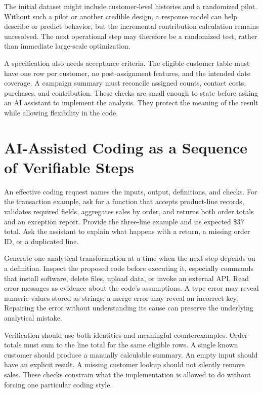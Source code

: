 The initial dataset might include customer-level histories and a
randomized pilot. Without such a pilot or another credible design, a
response model can help describe or predict behavior, but the
incremental contribution calculation remains unresolved. The next
operational step may therefore be a randomized test, rather than
immediate large-scale optimization.

A specification also needs acceptance criteria. The eligible-customer
table must have one row per customer, no post-assignment features, and
the intended date coverage. A campaign summary must reconcile assigned
counts, contact costs, purchases, and contribution. These checks are
small enough to state before asking an AI assistant to implement the
analysis. They protect the meaning of the result while allowing
flexibility in the code.

\hypertarget{M01-ai-assisted-coding-as-a-sequence-of-verifiable-steps}{%
\section{AI-Assisted Coding as a Sequence of Verifiable
Steps}\label{M01-ai-assisted-coding-as-a-sequence-of-verifiable-steps}}

\noindent An effective coding request names the inputs, output, definitions, and
checks. For the transaction example, ask for a function that accepts
product-line records, validates required fields, aggregates sales by
order, and returns both order totals and an exception report. Provide
the three-line example and its expected \$37 total. Ask the assistant to
explain what happens with a return, a missing order ID, or a duplicated
line.

Generate one analytical transformation at a time when the next step
depends on a definition. Inspect the proposed code before executing it,
especially commands that install software, delete files, upload data, or
invoke an external API. Read error messages as evidence about the code's
assumptions. A type error may reveal numeric values stored as strings; a
merge error may reveal an incorrect key. Repairing the error without
understanding its cause can preserve the underlying analytical mistake.

Verification should use both identities and meaningful counterexamples.
Order totals must sum to the line total for the same eligible rows. A
single known customer should produce a manually calculable summary. An
empty input should have an explicit result. A missing customer lookup
should not silently remove sales. These checks constrain what the
implementation is allowed to do without forcing one particular coding
style.

